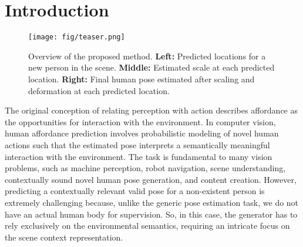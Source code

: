 \section{Introduction}
\label{sec:introduction}

\begin{figure*}[t]
  \centering
  \texttt{[image: fig/teaser.png]}
  \caption{Overview of the proposed method. \textbf{Left:} Predicted locations for a new person in the scene. \textbf{Middle:} Estimated scale at each predicted location. \textbf{Right:} Final human pose estimated after scaling and deformation at each predicted location.}
  \label{fig:introduction}
\end{figure*}

The original conception \cite{gibson1979ecological} of relating perception with action describes affordance as the opportunities for interaction with the environment. In computer vision, human affordance prediction involves probabilistic modeling of novel human actions such that the estimated pose interprets a semantically meaningful interaction with the environment. The task is fundamental to many vision problems, such as machine perception, robot navigation, scene understanding, contextually sound novel human pose generation, and content creation. However, predicting a contextually relevant valid pose for a non-existent person is extremely challenging because, unlike the generic pose estimation task, we do not have an actual human body for supervision. So, in this case, the generator has to rely exclusively on the environmental semantics, requiring an intricate focus on the scene context representation.

